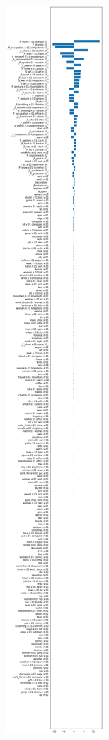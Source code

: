 \documentclass{article} %
\begin{document}
\begin{figure}[htbp]
	\begin{subfigure}{0.5\linewidth}
		\centering
		\includegraphics[height=\textheight]{../results/FEAT_idf*norm-simi2}

\end{subfigure}
\end{figure}
\end{document}
